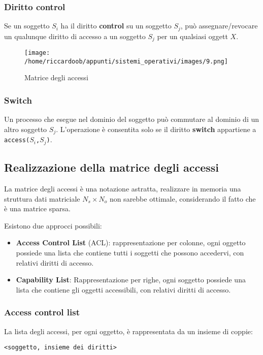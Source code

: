 \subsubsection{Diritto control}
Se un soggetto $S_i$ ha il diritto \textbf{control} su un soggetto $S_j$, può assegnare/revocare un qualunque diritto di accesso a un soggetto $S_j$ per un qualsiasi oggett $X$.
\begin{figure}[H]
    \caption{Matrice degli accessi}
    \centering
    \texttt{[image: /home/riccardoob/appunti/sistemi\_operativi/images/9.png]}
\end{figure}

\subsubsection{Switch}
Un processo che esegue nel dominio del soggetto può commutare al dominio di un altro soggetto $S_j$. L'operazione è consentita solo se il diritto \textbf{switch} appartiene a \texttt{access($S_i$,$S_j$)}.

\subsection{Realizzazione della matrice degli accessi}
La matrice degli accessi è una notazione astratta, realizzare in memoria una struttura dati matriciale $N_s \times N_o$ non sarebbe ottimale, considerando il fatto che è una matrice sparsa.

Esistono due approcci possibili:
\begin{itemize}
    \item \textbf{Access Control List} (ACL): rappresentazione per colonne, ogni oggetto possiede una lista che contiene tutti i soggetti che possono accedervi, con relativi diritti di accesso.
    \item \textbf{Capability List}: Rappresentazione per righe, ogni soggetto possiede una lista che contiene gli oggetti accessibili, con relativi diritti di accesso.
\end{itemize}

\subsubsection{Access control list}
La lista degli accessi, per ogni oggetto, è rappresentata da un insieme di coppie:

{\centering
\texttt{<soggetto, insieme dei diritti>} \par}   


